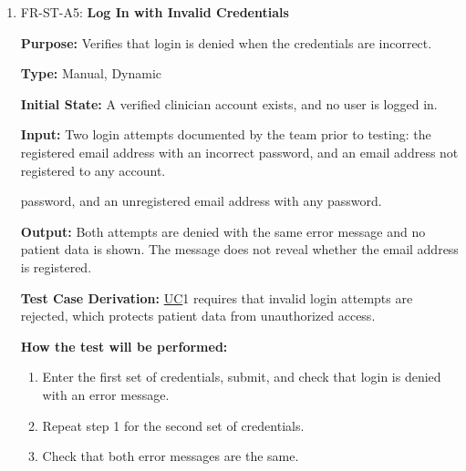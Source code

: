 \documentclass[12pt, titlepage]{article}
\newcommand{\srsuc}[1]{\href{https://github.com/Nour-Fawaz/MacaBoca/blob/main/pdfs/SRS/SRS.pdf}{UC}}
\renewcommand{\_}{\oldunderscore\allowbreak}
\begin{document}
\begin{enumerate}
  \item FR-ST-A5: \textbf{Log In with Invalid Credentials\\}
  \begin{mdframed}[linewidth=0.5mm]
      \textbf{Purpose:} Verifies that login is denied when the credentials are incorrect. \par
      \textbf{Type:} Manual, Dynamic \par
      \textbf{Initial State:} A verified clinician account exists, and no user is logged in. \par
      \textbf{Input:} Two login attempts documented by the team prior to testing: the registered email address with an incorrect password, and an email address not registered to any account. \par       password, and an unregistered email address with any password. \par
      \textbf{Output:} Both attempts are denied with the same error message and no
       patient data is shown. The message does not reveal whether the email address is registered. \par
      \textbf{Test Case Derivation:} \srsuc*{1} requires that invalid login attempts are rejected, which protects patient data from unauthorized access. \par
      \textbf{How the test will be performed:}
      \begin{enumerate}
          \item[1.] Enter the first set of credentials, submit, and check that login is denied with an error message.
          \item[2.] Repeat step 1 for the second set of credentials.
          \item[3.] Check that both error messages are the same.
      \end{enumerate}
  \end{mdframed}


\end{enumerate}
\end{document}
